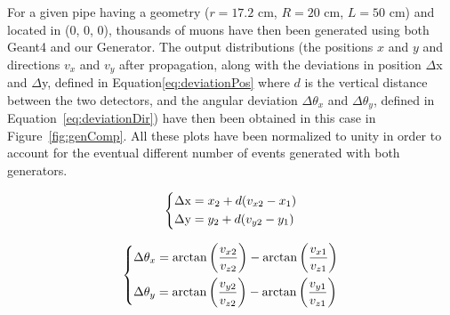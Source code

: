 \documentclass[a4paper, 11pt]{report}
\begin{document}
For a given pipe having a geometry ($r = 17.2$ cm, $R = 20$ cm, $L = 50$ cm) and located in (0, 0, 0), thousands of muons have then been generated using both Geant4 and our Generator. The output distributions (the positions $x$ and $y$ and directions $v_x$ and $v_y$ after propagation, along with the deviations in position $\Delta$x and $\Delta$y, defined in Equation\ref{eq:deviationPos} where $d$ is the vertical distance between the two detectors, and the angular deviation $\Delta \theta_x$ and $\Delta \theta_y$, defined in Equation~\ref{eq:deviationDir}) have then been obtained in this case in Figure~\ref{fig:genComp}. All these plots have been normalized to unity in order to account for the eventual different number of events generated with both generators.

\begin{equation}
\label{eq:deviationPos}
\begin{dcases}
\Delta \text{x} = x_2 + d (v_{x2} - x_1)  \\
\Delta \text{y} = y_2 + d (v_{y2} - y_1)
\end{dcases}
\end{equation}

\begin{equation}
\label{eq:deviationDir}
\begin{dcases}
\Delta \theta_x = \arctan \left ({\frac{v_{x2}}{v_{z2}}} \right ) - \arctan \left ({\frac{v_{x1}}{v_{z1}}} \right ) \\
\Delta \theta_y = \arctan \left ({\frac{v_{y2}}{v_{z2}}} \right ) - \arctan \left ({\frac{v_{y1}}{v_{z1}}} \right )
\end{dcases}
\end{equation}
\end{document}
